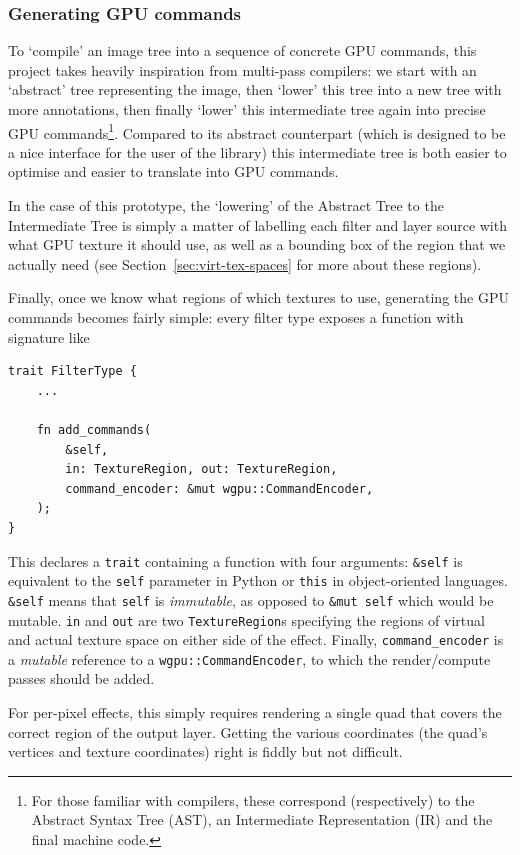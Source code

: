 \documentclass[12pt]{article}
\begin{document}
\subsubsection{Generating GPU commands}\label{sec:gpu-cmds}

To `compile' an image tree into a sequence of concrete GPU commands, this project takes heavily
inspiration from multi-pass compilers: we start with an `abstract' tree representing the image, then
`lower' this tree into a new tree with more annotations, then finally `lower' this intermediate tree
again into precise GPU commands\footnote{For those familiar with compilers, these correspond
(respectively) to the Abstract Syntax Tree (AST), an Intermediate Representation (IR) and the final
machine code.}.  Compared to its abstract counterpart (which is designed to be a nice interface for
the user of the library) this intermediate tree is both easier to optimise and easier to translate
into GPU commands.

In the case of this prototype, the `lowering' of the Abstract Tree to the Intermediate Tree is
simply a matter of labelling each filter and layer source with what GPU texture it should use, as
well as a bounding box of the region that we actually need (see Section~\ref{sec:virt-tex-spaces}
for more about these regions).

Finally, once we know what regions of which textures to use, generating the GPU commands becomes
fairly simple: every filter type exposes a function with signature like

\begin{verbatim}
trait FilterType {
    ...

    fn add_commands(
        &self,
        in: TextureRegion, out: TextureRegion,
        command_encoder: &mut wgpu::CommandEncoder,
    );
}
\end{verbatim}

This declares a \verb|trait| containing a function with four arguments: \verb|&self| is equivalent
to the \verb|self| parameter in Python or \verb|this| in object-oriented languages.  \verb|&self|
means that \verb|self| is \emph{immutable}, as opposed to \verb|&mut self| which would be mutable.
\verb|in| and \verb|out| are two \verb|TextureRegion|s specifying the regions of virtual and actual
texture space on either side of the effect.  Finally, \verb|command_encoder| is a \emph{mutable}
reference to a \verb|wgpu::CommandEncoder|, to which the render/compute passes should be added.

For per-pixel effects, this simply requires rendering a single quad that covers the correct region
of the output layer.  Getting the various coordinates (the quad's vertices and texture coordinates)
right is fiddly but not difficult.
\end{document}
